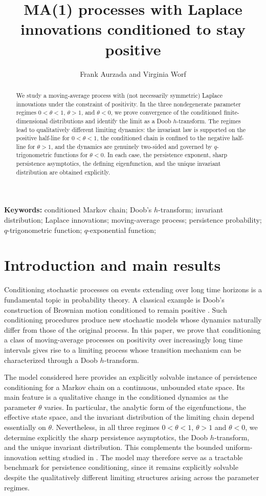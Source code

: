 \documentclass[12pt]{article}
\title{MA(1) processes with Laplace innovations conditioned to stay positive}
\author{Frank Aurzada and  Virginia Worf}
\newcommand{\1}{\mathds{1}}
\theoremstyle{definition}
\theoremstyle{plain}
\theoremstyle{remark}
\begin{document}
\maketitle
	
\allowdisplaybreaks
\begin{abstract}
  We study a moving-average process with (not necessarily symmetric) Laplace innovations under the constraint of positivity. In the three nondegenerate parameter regimes $0<\theta<1$, $\theta>1$, and $\theta<0$, we prove convergence of the conditioned finite-dimensional distributions and identify the limit as a Doob $h$-transform. The regimes lead to qualitatively different limiting dynamics: the invariant law is supported on the positive half-line for $0<\theta<1$, the conditioned chain is confined to the negative half-line for $\theta>1$, and the dynamics are genuinely two-sided and governed by $q$-trigonometric functions for $\theta<0$. In each case, the persistence exponent, sharp persistence asymptotics, the defining eigenfunction, and the unique invariant distribution are obtained explicitly.
\end{abstract}
{\bf Keywords:} conditioned Markov chain; Doob's $h$-transform; invariant distribution; Laplace innovations; moving-average process; persistence probability; $q$-trigonometric function; $q$-ex\-po\-nen\-tial function;
\section{Introduction and main results}
Conditioning stochastic processes on events extending over long time horizons is a fundamental topic in probability theory. A classical example is Doob's construction of Brownian motion conditioned to remain positive \cite{doob}. Such conditioning procedures produce new stochastic models whose dynamics naturally differ from those of the original process. In this paper, we prove that conditioning a class of moving-average processes on positivity over increasingly long time intervals gives rise to a limiting process whose transition mechanism can be characterized through a Doob $h$-transform.

The model considered here provides an explicitly solvable instance of persistence conditioning for a Markov chain on a continuous, unbounded state space. Its main feature is a qualitative change in the conditioned dynamics as the parameter $\theta$ varies. In particular, the analytic form of the eigenfunctions, the effective state space, and the invariant distribution of the limiting chain depend essentially on $\theta$.
Nevertheless, in all three regimes $0<\theta<1$, $\theta>1$ and $\theta<0$, we determine explicitly the sharp persistence asymptotics, the Doob $h$-transform, and the unique invariant distribution. This complements the bounded uniform-innovation setting studied in \cite{AW}. The model may therefore serve as a tractable benchmark for persistence conditioning, since it remains explicitly solvable despite the qualitatively different limiting structures arising across the parameter regimes.
\end{document}
